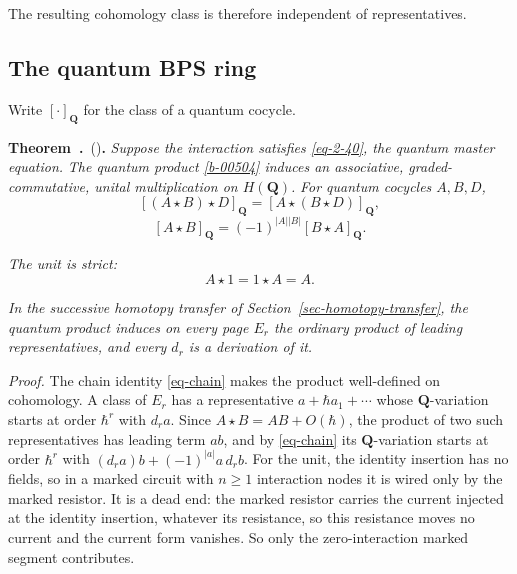 \documentclass[11pt]{article}
\numberwithin{equation}{section}
\numberwithin{figure}{section}
\numberwithin{table}{section}
\newcounter{rthmc}[section]
\renewcommand{\therthmc}{\thesection.\arabic{rthmc}}
\newcommand{\rthm}[3]{\par\addvspace{\medskipamount}\noindent\refstepcounter{rthmc}\label{#2}\textbf{#1~\therthmc}\if\relax\detokenize{#3}\relax\else\ (#3)\fi\textbf{.}}
\begin{document}
The resulting cohomology class is therefore independent of representatives.~\hfill\qedsymbol

\subsection{The quantum BPS ring}\label{sec-ring}

Write $[\cdot]_{\mathbf Q}$ for the class of a quantum cocycle.

\rthm{Theorem}{b-00513}{} \emph{Suppose the interaction satisfies \eqref{eq-2-40}, the quantum master equation. } \emph{The quantum product \eqref{b-00504} induces an associative, graded-commutative, unital multiplication on $H(\mathbf Q)$. } \emph{For quantum cocycles $A,B,D$,}
\begin{equation}\label{eq-ring-associativity}
[(A\star B)\star D]_{\mathbf Q}
=[A\star(B\star D)]_{\mathbf Q},
\end{equation}
\begin{equation}\label{eq-ring-commutativity}
[A\star B]_{\mathbf Q}
=(-1)^{|A||B|}[B\star A]_{\mathbf Q}.
\end{equation}

\emph{The unit is strict:}
\begin{equation}\label{eq-ring-unit}
A\star1=1\star A=A.
\end{equation}

\emph{In the successive homotopy transfer of Section~\ref{sec-homotopy-transfer}, the quantum product induces on every page $E_r$ the ordinary product of leading representatives, and every $d_r$ is a derivation of it.}

\emph{Proof.} The chain identity \eqref{eq-chain} makes the product well-defined on cohomology. A class of $E_r$ has a representative $a+\hbar a_1+\cdots$ whose $\mathbf Q$-variation starts at order $\hbar^r$ with $d_ra$. Since $A\star B=AB+O(\hbar)$, the product of two such representatives has leading term $ab$, and by \eqref{eq-chain} its $\mathbf Q$-variation starts at order $\hbar^r$ with $(d_ra)b+(-1)^{|a|}a\,d_rb$. For the unit, the identity insertion has no fields, so in a marked circuit with $n\ge1$ interaction nodes it is wired only by the marked resistor. It is a dead end: the marked resistor carries the current injected at the identity insertion, whatever its resistance, so this resistance moves no current and the current form vanishes. So only the zero-interaction marked segment contributes.
\end{document}
